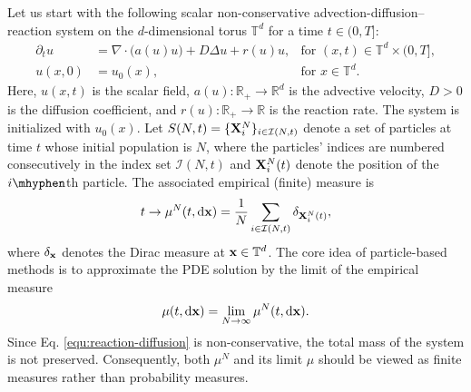 \documentclass[a4paper,fleqn]{cas-sc}
\theoremstyle{definition}
\theoremstyle{remark}
\begin{document}
Let us start with the following scalar non-conservative advection-diffusion–reaction system on the $d$-dimensional torus $\mathbb{T}^d$ for a time $t \in (0, T]$:
\begin{subequations}\label{equ:reaction-diffusion}
\begin{align}
\partial_t u &= \nabla \!\cdot\! \big( a(u) u \big) + D \Delta u + r(u) u, & \text{for } (x, t) \in \mathbb{T}^d \times (0, T], \label{equ:pde} \\
u(x, 0) &= u_0(x), & \text{for } x \in \mathbb{T}^d. \label{equ:ic}
\end{align}
\end{subequations}
Here, $u(x,t)$ is the scalar field, $a(u): \mathbb{R}_{+} \to \mathbb{R}^d$ is the advective velocity, $D > 0$ is the diffusion coefficient, and $r(u): \mathbb{R}_{+} \to \mathbb{R}$ is the reaction rate. The system is initialized with $u_0(x)$.
Let $S(N,t)=\{\mathbf{X}^N_i\}_{i\in\mathcal I(N,t)}$ denote a set of particles at time $t$ whose initial population is $N$, where the particles' indices are numbered consecutively in the index set $\mathcal I(N,t)$ and $\mathbf{X}^N_i(t)$ denote the position of the $i\mhyphen$th particle. The associated empirical (finite) measure is
\begin{equation}
    t \to \mu^N(t,\mathrm{d} \mathbf{x}) =  \frac{1}{N}\sum_{i\in \mathcal I(N,t)}\delta_{\mathbf{X}^N_i(t)},
\end{equation}
where $\delta_{\mathbf{x}} $ denotes the Dirac measure at $\mathbf{x}\in \mathbb{T}^d$. The core idea of particle-based methods is to approximate the PDE solution by the limit of the empirical measure
\[
\mu(t,\mathrm{d}\mathbf{x}) = \lim_{N\to\infty} \mu^N(t,\mathrm{d}\mathbf{x}).
\]
Since Eq. \eqref{equ:reaction-diffusion} is non-conservative, the total mass of the system is not preserved. Consequently, both $\mu^N$ and its limit $\mu$ should be viewed as finite measures rather than probability measures.
\end{document}
